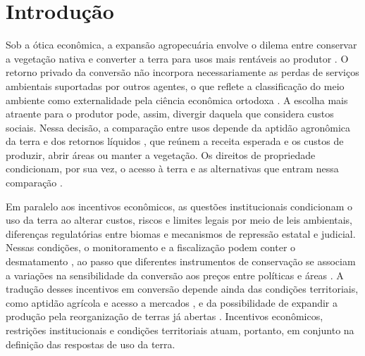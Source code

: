 \section*{Introdução}

\label{sec:introducao}


Sob a ótica econômica, a expansão agropecuária envolve o dilema entre conservar a vegetação nativa e converter a terra para usos mais rentáveis ao produtor \cite{Angelsen2010}. O retorno privado da conversão não incorpora necessariamente as perdas de serviços ambientais suportadas por outros agentes, o que reflete a classificação do meio ambiente como externalidade pela ciência econômica ortodoxa \cite{harris2021theory}. A escolha mais atraente para o produtor pode, assim, divergir daquela que considera custos sociais. Nessa decisão, a comparação entre usos depende da aptidão agronômica da terra e dos retornos líquidos \cite{LubowskiEtAl2008}, que reúnem a receita esperada e os custos de produzir, abrir áreas ou manter a vegetação. Os direitos de propriedade condicionam, por sua vez, o acesso à terra e as alternativas que entram nessa comparação \cite{alstonTitlesConflictLand1999}.

Em paralelo aos incentivos econômicos, as questões institucionais condicionam o uso da terra ao alterar custos, riscos e limites legais por meio de leis ambientais, diferenças regulatórias entre biomas e mecanismos de repressão estatal e judicial. Nessas condições, o monitoramento e a fiscalização podem conter o desmatamento \cite{AssuncaoEtAl2023}, ao passo que diferentes instrumentos de conservação se associam a variações na sensibilidade da conversão aos preços entre políticas e áreas \cite{HardingEtAl2021}. A tradução desses incentivos em conversão depende ainda das condições territoriais, como aptidão agrícola e acesso a mercados \cite{ChomitzThomas2003,BermanEtAl2023}, e da possibilidade de expandir a produção pela reorganização de terras já abertas \cite{Braganca2018}. Incentivos econômicos, restrições institucionais e condições territoriais atuam, portanto, em conjunto na definição das respostas de uso da terra.

